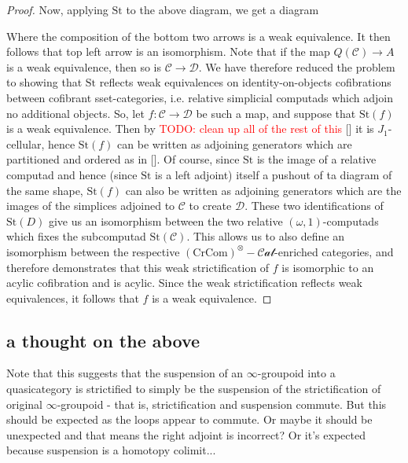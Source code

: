 \documentclass[12pt]{article}
\theoremstyle{definition}
\newcommand{\TODO}[1]{\textcolor{red}{TODO: {#1}}}
\newcommand{\C}{\mathcal{C}}
\newcommand{\D}{\mathcal{D}}
\newcommand{\crcom}{\text{CrCom}}
\newcommand{\tensorcrossedcat}{(\crcom)^\otimes-\mathcal{Cat}}
\newcommand{\st}{\text{St}}
\begin{document}
\begin{proof}
		Now, applying $\st$ to the above diagram, we get a diagram
		\begin{center}
		\end{center}
		Where the composition of the bottom two arrows is a weak equivalence. It then follows that top left arrow is an isomorphism. Note that if the map $Q(\C) \to A$ is a weak equivalence, then so is $\C \to \D$. 
		We have therefore reduced the problem to showing that $\st$ reflects weak equivalences on identity-on-objects cofibrations between cofibrant sset-categories, i.e. relative simplicial computads which adjoin no additional objects. 
		So, let $f: \C \to \D$ be such a map, and suppose that $\st(f)$ is a weak equivalence. Then by \TODO{clean up all of the rest of this} [] it is $J_1$-cellular, hence $\st(f)$ can be written as adjoining generators which are partitioned and ordered as in [].
		Of course, since $\st$ is the image of a relative computad and hence (since $\st$ is a left adjoint) itself a pushout of ta diagram of the same shape, $\st(f)$ can also be written as adjoining generators which are the images of the simplices adjoined to $\C$ to create $\D$. These two identifications of $\st(D)$ give us an isomorphism between the two relative $(\omega,1)$-computads which fixes the subcomputad $\st(\C)$. This allows us to also define an isomorphism between the respective $\tensorcrossedcat$-enriched categories, and therefore demonstrates that this weak strictification of $f$ is isomorphic to an acylic cofibration and is acylic. Since the weak strictification reflects weak equivalences, it follows that $f$ is a weak equivalence. 
	\end{proof}
\subsection{a thought on the above}
		Note that this suggests that the suspension of an $\infty$-groupoid into a quasicategory is strictified to simply be the suspension of the strictification of original $\infty$-groupoid - that is, strictification and suspension commute. But this should be expected as the loops appear to commute. Or maybe it should be unexpected and that means the right adjoint is incorrect? Or it's expected because suspension is a homotopy colimit...
\end{document}
